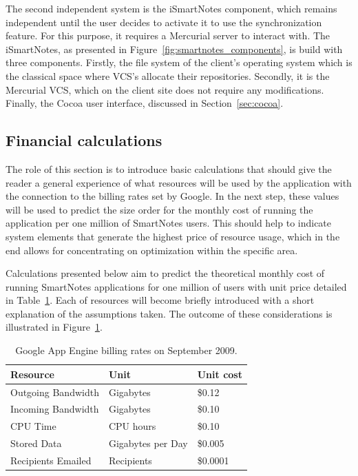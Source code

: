 The second independent system is the iSmartNotes component, which remains independent until the user decides to activate it to use the synchronization feature. For this purpose, it requires a Mercurial server to interact with. The iSmartNotes, as presented in Figure~\ref{fig:smartnotes_components}, is build with three components. Firstly, the file system of the client's operating system which is the classical space where VCS's allocate their repositories. Secondly, it is the Mercurial VCS, which on the client site does not require any modifications. Finally, the Cocoa user interface, discussed in Section~\ref{sec:cocoa}.
 
\subsection{Financial calculations}\label{subsec:gae_calculations}
The role of this section is to introduce basic calculations that should give the reader a general experience of what resources will be used by the application with the connection to the billing rates set by Google. In the next step, these values will be used to predict the size order for the monthly cost of running the application per one million of SmartNotes users. This should help to indicate system elements that generate the highest price of resource usage, which in the end allows for concentrating on optimization within the specific area.
 
Calculations presented below aim to predict the theoretical monthly cost of running SmartNotes applications for one million of users with unit price detailed in Table~\ref{tab:gae_cost}. Each of resources will become briefly introduced with a short explanation of the assumptions taken. The outcome of these considerations is illustrated in Figure~\ref{tab:gae_cost}.
\begin{table}[h]
\centering
\caption{Google App Engine billing rates on September 2009.}
\label{tab:gae_cost}
\begin{tabular}{|l|l|l|} \hline \hline
\textbf{Resource} & \textbf{Unit} & \textbf{Unit cost} \\ \hline \hline
Outgoing Bandwidth & Gigabytes & \$0.12 \\ \hline
Incoming Bandwidth & Gigabytes & \$0.10 \\ \hline
CPU Time & CPU hours & \$0.10 \\ \hline
Stored Data & Gigabytes per Day & \$0.005 \\ \hline
Recipients Emailed & Recipients & \$0.0001\\ \hline \hline
\end{tabular}
\end{table}
 
